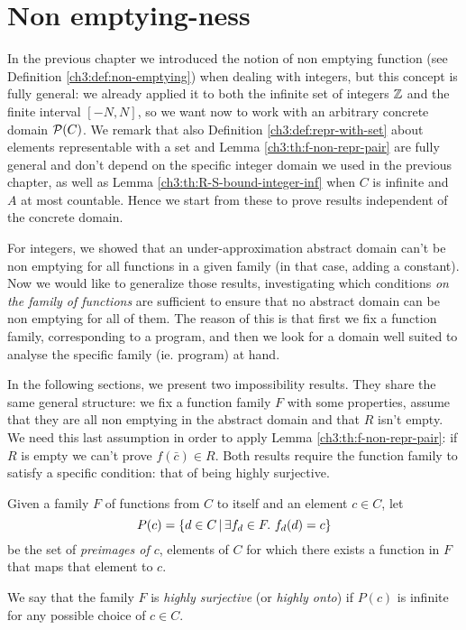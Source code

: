 \section{Non emptying-ness}
In the previous chapter we introduced the notion of non emptying function (see Definition \ref{ch3:def:non-emptying}) when dealing with integers, but this concept is fully general: we already applied it to both the infinite set of integers $\mathbb{Z}$ and the finite interval $[-N, N]$, so we want now to work with an arbitrary concrete domain $\mathcal{P}(C)$.
We remark that also Definition \ref{ch3:def:repr-with-set} about elements representable with a set and Lemma \ref{ch3:th:f-non-repr-pair} are fully general and don't depend on the specific integer domain we used in the previous chapter, as well as Lemma \ref{ch3:th:R-S-bound-integer-inf} when $C$ is infinite and $A$ at most countable. Hence we start from these to prove results independent of the concrete domain.

For integers, we showed that an under-approximation abstract domain can't be non emptying for all functions in a given family (in that case, adding a constant). Now we would like to generalize those results, investigating which conditions \textit{on the family of functions} are sufficient to ensure that no abstract domain can be non emptying for all of them. The reason of this is that first we fix a function family, corresponding to a program, and then we look for a domain well suited to analyse the specific family (ie. program) at hand.

In the following sections, we present two impossibility results. They share the same general structure: we fix a function family $F$ with some properties, assume that they are all non emptying in the abstract domain and that $R$ isn't empty. We need this last assumption in order to apply Lemma \ref{ch3:th:f-non-repr-pair}: if $R$ is empty we can't prove $f(\bar{c}) \in R$.
Both results require the function family to satisfy a specific condition: that of being highly surjective.

\begin{definition}\label{ch4:def:highly-onto-func-family}
	Given a family $F$ of functions from $C$ to itself and an element $c \in C$, let
	\[
	P(c) = \{ d \in C \,\vert\, \exists f_d \in F .\ f_d(d) = c \}
	\]
	be the set of \textit{preimages of $c$}, elements of $C$ for which there exists a function in $F$ that maps that element to $c$.

	We say that the family $F$ is \textit{highly surjective} (or \textit{highly onto}) if $P(c)$ is infinite for any possible choice of $c \in C$.
\end{definition}

